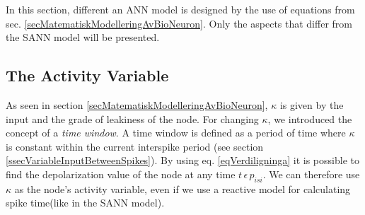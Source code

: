 	In this section, different an ANN model is designed by the use of equations from sec. \ref{secMatematiskModelleringAvBioNeuron}.
	Only the aspects that differ from the SANN model will be presented. 
	




 		\subsection{The Activity Variable} %

	As seen in section \ref{secMatematiskModelleringAvBioNeuron}, $\kappa$ is given by the input and the grade of leakiness of the node.
	For changing $\kappa$, we introduced the concept of a \emph{time window}. 
	A time window is defined as a period of time where $\kappa$ is constant within the current interspike period (see section \ref{ssecVariableInputBetweenSpikes}).
	By using eq. \eqref{eqVerdiligninga} it is possible to find the depolarization value of the node at any time $t \, \epsilon \, p_{isi}$.
	We can therefore use $\kappa$ as the node's activity variable, even if we use a reactive model for calculating spike time(like in the SANN model). 

